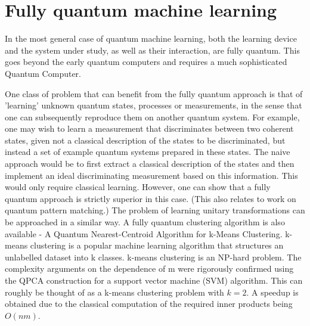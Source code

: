 \section{Fully quantum machine learning}
In the most general case of quantum machine learning, both the learning device and the system under study, as well as their interaction, are fully quantum. This goes beyond the early quantum computers and requires a much sophisticated Quantum Computer.\par\bigskip
One class of problem that can benefit from the fully quantum approach is that of 'learning' unknown quantum states, processes or measurements, in the sense that one can subsequently reproduce them on another quantum system. For example, one may wish to learn a measurement that discriminates between two coherent states, given not a classical description of the states to be discriminated, but instead a set of example quantum systems prepared in these states. The naive approach would be to first extract a classical description of the states and then implement an ideal discriminating measurement based on this information. This would only require classical learning. However, one can show that a fully quantum approach is strictly superior in this case. (This also relates to work on quantum pattern matching.) The problem of learning unitary transformations can be approached in a similar way.
A fully quantum clustering algorithm is also available - A Quantum Nearest-Centroid Algorithm for k-Means Clustering. k-means clustering is a popular machine learning algorithm that structures an unlabelled dataset into k classes. k-means clustering is an NP-hard problem. The complexity arguments on the dependence of m were rigorously confirmed using the QPCA construction for a support vector machine (SVM) algorithm. This can roughly be thought of as a k-means clustering problem with $k=2$. A speedup is obtained due to the classical computation of the required inner products being $O(nm)$.


